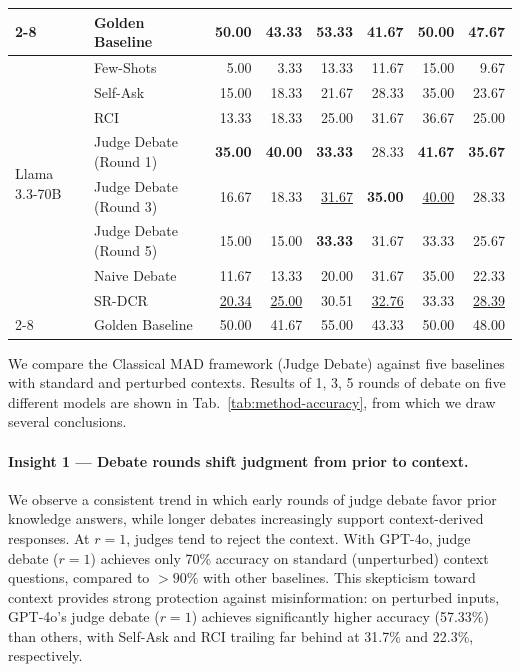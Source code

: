 \documentclass[11pt]{article}
\begin{document}
\begin{table}[ht]
{\begin{tabular}{llrrrrrr}
    \cmidrule(lr){2-8}
     & Golden Baseline & 50.00 & 43.33 & 53.33 & 41.67 & 50.00 & 47.67 \\
    \midrule
     \multirow{8}{*}{Llama 3.3-70B}
     & Few-Shots & 5.00 & 3.33 & 13.33 & 11.67 & 15.00 & 9.67 \\
     & Self-Ask & 15.00 & 18.33 & 21.67 & 28.33 & 35.00 & 23.67 \\
     & RCI & 13.33 & 18.33 & 25.00 & 31.67 & 36.67 & 25.00 \\
     & Judge Debate (Round 1) & \textbf{35.00} & \textbf{40.00} & \textbf{33.33} & 28.33 & \textbf{41.67} & \textbf{35.67} \\
     & Judge Debate (Round 3) & 16.67 & 18.33 & \underline{31.67} & \textbf{35.00} & \underline{40.00} & 28.33 \\
     & Judge Debate (Round 5) & 15.00 & 15.00 & \textbf{33.33} & 31.67 & 33.33 & 25.67 \\
     & Naive Debate & 11.67 & 13.33 & 20.00 & 31.67 & 35.00 & 22.33 \\
     & SR-DCR & \underline{20.34} & \underline{25.00} & 30.51 & \underline{32.76} & 33.33 & \underline{28.39} \\
    \cmidrule(lr){2-8}
     & Golden Baseline & 50.00 & 41.67 & 55.00 & 43.33 & 50.00 & 48.00 \\
    \bottomrule
  \end{tabular}
  }
\vspace{-1em}
\end{table}

We compare the Classical MAD framework (Judge Debate) against five baselines with standard and perturbed contexts. Results of 1, 3, 5 rounds of debate on five different models are shown in Tab.~\ref{tab:method-accuracy}, from which we draw several conclusions. 

\paragraph{Insight 1 — Debate rounds shift judgment from prior to context.}  
We observe a consistent trend in which early rounds of judge debate favor prior knowledge answers, while longer debates increasingly support context-derived responses. At \(r = 1\), judges tend to reject the context. With GPT-4o, judge debate (\(r = 1\)) achieves only 70\% accuracy on standard (unperturbed) context questions, compared to $>90\%$ with other baselines. This skepticism toward context provides strong protection against misinformation: on perturbed inputs, GPT-4o’s judge debate  (\(r = 1\)) achieves significantly higher accuracy (57.33\%) than others, with Self-Ask and RCI trailing far behind at 31.7\% and 22.3\%, respectively.
\end{document}
